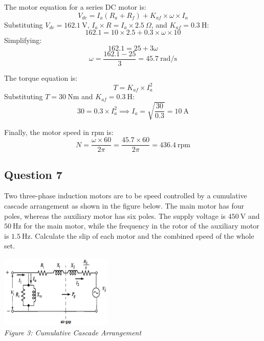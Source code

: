 \documentclass[12pt]{report}
\begin{document}
	\noindent The motor equation for a series DC motor is:
	\[V_{dc} = I_a (R_a + R_f) + K_{af} \times \omega \times I_a\]
	Substituting \(V_{dc} = 162.1\ \text{V}\), \(I_a \times R = I_a \times 2.5\ \Omega\), and \(K_{af} = 0.3\ \text{H}\):
	\[162.1 = 10 \times 2.5 + 0.3 \times \omega \times 10\]
	Simplifying:
	\[162.1 = 25 + 3\omega\]
	\[\omega = \frac{162.1 - 25}{3} = 45.7\ \text{rad/s}\]
	
	\noindent The torque equation is:
	\[T = K_{af} \times I_a^2\]
	Substituting \(T = 30\ \text{Nm}\) and \(K_{af} = 0.3\ \text{H}\):
	\[30 = 0.3 \times I_a^2 \implies I_a = \sqrt{\frac{30}{0.3}} = 10\ \text{A}\]
	
	\noindent Finally, the motor speed in rpm is:
	\[N = \frac{\omega \times 60}{2\pi} = \frac{45.7 \times 60}{2\pi} = 436.4\ \text{rpm}\]
	
	
	
	\subsection*{Question 7}
	Two three-phase induction motors are to be speed controlled by a cumulative cascade arrangement as shown in the figure below. The main motor has four poles, whereas the auxiliary motor has six poles. The supply voltage is $450 \ \text{V}$ and $50 \ \text{Hz}$ for the main motor, while the frequency in the rotor of the auxiliary motor is $1.5 \ \text{Hz}$. Calculate the slip of each motor and the combined speed of the whole set.
	
	\begin{center}
		\includegraphics[width=0.4\textwidth]{Picture3.png}
		\\[1em]
		\textit{Figure 3: Cumulative Cascade Arrangement}
	\end{center}
	
	

	
\end{document}
